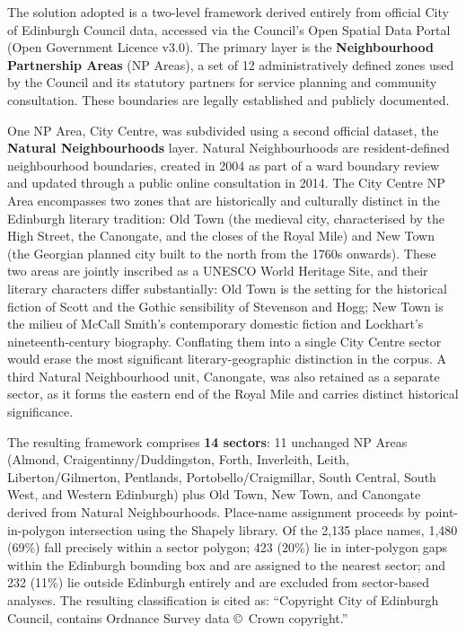 \documentclass[logo,msc]{infthesis}
\begin{document}
The solution adopted is a two-level framework derived entirely from official City of Edinburgh Council data, accessed via the Council's Open Spatial Data Portal (Open Government Licence v3.0). The primary layer is the \textbf{Neighbourhood Partnership Areas} (NP Areas), a set of 12 administratively defined zones used by the Council and its statutory partners for service planning and community consultation. These boundaries are legally established and publicly documented.
 
One NP Area, City Centre, was subdivided using a second official dataset, the \textbf{Natural Neighbourhoods} layer. Natural Neighbourhoods are resident-defined neighbourhood boundaries, created in 2004 as part of a ward boundary review and updated through a public online consultation in 2014. The City Centre NP Area encompasses two zones that are historically and culturally distinct in the Edinburgh literary tradition: Old Town (the medieval city, characterised by the High Street, the Canongate, and the closes of the Royal Mile) and New Town (the Georgian planned city built to the north from the 1760s onwards). These two areas are jointly inscribed as a UNESCO World Heritage Site, and their literary characters differ substantially: Old Town is the setting for the historical fiction of Scott and the Gothic sensibility of Stevenson and Hogg; New Town is the milieu of McCall Smith's contemporary domestic fiction and Lockhart's nineteenth-century biography. Conflating them into a single City Centre sector would erase the most significant literary-geographic distinction in the corpus. A third Natural Neighbourhood unit, Canongate, was also retained as a separate sector, as it forms the eastern end of the Royal Mile and carries distinct historical significance.
 
The resulting framework comprises \textbf{14 sectors}: 11 unchanged NP Areas (Almond, Craigentinny/Duddingston, Forth, Inverleith, Leith, Liberton/Gilmerton, Pentlands, Portobello/Craigmillar, South Central, South West, and Western Edinburgh) plus Old Town, New Town, and Canongate derived from Natural Neighbourhoods. Place-name assignment proceeds by point-in-polygon intersection using the Shapely library. Of the 2,135 place names, 1,480 (69\%) fall precisely within a sector polygon; 423 (20\%) lie in inter-polygon gaps within the Edinburgh bounding box and are assigned to the nearest sector; and 232 (11\%) lie outside Edinburgh entirely and are excluded from sector-based analyses. The resulting classification is cited as: ``Copyright City of Edinburgh Council, contains Ordnance Survey data \copyright\ Crown copyright.''
 
\end{document}
